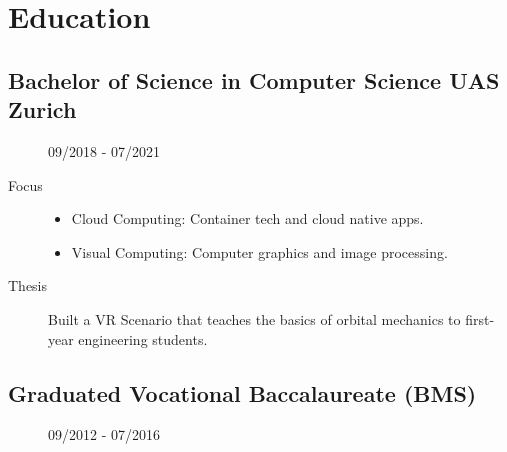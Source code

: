 \section{Education}
\subsection{Bachelor of Science in Computer Science UAS Zurich}
\begin{description}
    \item[\faCalendar] 09/2018 - 07/2021
    \item[Focus]
    \begin{itemize}
        \item Cloud Computing: Container tech and cloud native apps.
        \item Visual Computing: Computer graphics and image processing.
    \end{itemize}
    \item[Thesis] Built a VR Scenario that teaches the basics of orbital mechanics to first-year engineering students.
\end{description}
\dottedline

\subsection{Graduated Vocational Baccalaureate (BMS)}
\begin{description}
    \item[\faCalendar\color{altColor}] 09/2012 - 07/2016
\end{description}
